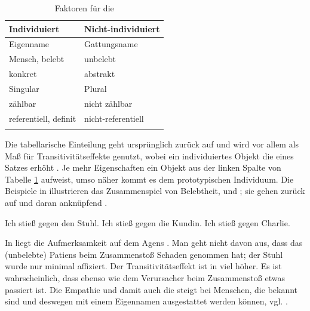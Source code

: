 \begin{table}[h]
\begin{tabular}{ll}
\lsptoprule
Individuiert & Nicht-individuiert\\ \midrule
Eigenname                    & Gattungsname         \\
Mensch, belebt               & unbelebt             \\
konkret                      & abstrakt             \\
Singular                     & Plural               \\
zählbar                      & nicht zählbar        \\
referentiell, definit        & nicht-referentiell   \\ \lspbottomrule
\end{tabular}
\caption{Faktoren für die   \parencite[253]{Hopper1980}\label{tab:indi}}
\end{table}

Die tabellarische Einteilung geht ursprünglich zurück auf \textcite{Timberlake1975,Timberlake1977} und wird vor allem als Maß für Transitivitätseffekte  genutzt, wobei ein individuiertes  Objekt  die  eines Satzes erhöht \parencite[s. auch][]{Gillmann2016}. Je mehr Eigenschaften ein Objekt aus der linken Spalte von Tabelle \ref{tab:indi} aufweist, umso näher kommt es dem prototypischen Individuum. 
Die Beispiele in  illustrieren das Zusammenspiel von Belebtheit,   und ; sie gehen zurück auf \textcite[253]{Hopper1980} und daran anknüpfend \textcite[344]{Szczepaniak2011}.

\begin{exe}
	\ex \label{ex:stossen}
	\begin{xlist}
		\ex \label{ex:stuhl} Ich stieß gegen den Stuhl.
 		\ex \label{ex:kundin} Ich stieß gegen die Kundin.
		\ex \label{ex:chalie} Ich stieß gegen Charlie.
	\end{xlist}
\end{exe}
\noindent
In  liegt die Aufmerksamkeit auf dem Agens  . Man geht nicht davon aus, dass das (unbelebte)  Patiens   beim  Zusammenstoß Schaden genommen hat; der Stuhl wurde nur minimal affiziert. Der Transitivitätseffekt  ist in  viel höher. Es ist wahrscheinlich, dass  ebenso wie dem Verursacher beim Zusammenstoß etwas passiert ist. Die Empathie und damit auch die   steigt bei Menschen, die bekannt sind und deswegen mit einem Eigennamen ausgestattet werden können, vgl. .

